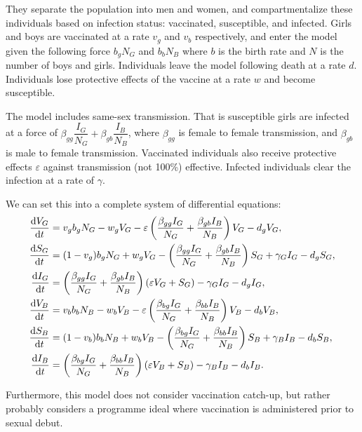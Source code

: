 \documentclass[12pt]{article}
\begin{document}
They separate the population into men and women, and compartmentalize these individuals based on infection status: vaccinated, susceptible, and infected. Girls and boys are vaccinated at a rate $v_g$ and $v_b$ respectively, and enter the model given the following force $b_gN_G$ and $b_bN_B$ where $b$ is the birth rate and $N$ is the number of boys and girls. Individuals leave the model following death at a rate $d$. Individuals lose protective effects of the vaccine at a rate $w$ and become susceptible.  

The model includes same-sex transmission.  That is susceptible girls are infected at a force of $\beta_{gg}\dfrac{I_G}{N_G} + \beta_{gb}\dfrac{I_B}{N_B}$, where $\beta_{gg}$ is female to female transmission, and $\beta_{gb}$ is male to female transmission. Vaccinated individuals also receive protective effects $\varepsilon$ against transmission (not 100\%) effective.  Infected individuals clear the infection at a rate of $\gamma$.  

We can set this into a complete system of differential equations:
\begin{align}
\frac{\mathrm{d}V_G}{\mathrm{d}t}&=v_gb_gN_G - w_gV_G - \varepsilon\left(\frac{\beta_{gg}I_G}{N_G}+\frac{\beta_{gb}I_B}{N_B}\right)V_G - d_gV_G,\\
\frac{\mathrm{d}S_G}{\mathrm{d}t}&=(1-v_g)b_gN_G + w_gV_G - \left(\frac{\beta_{gg}I_G}{N_G}+\frac{\beta_{gb}I_B}{N_B}\right)S_G  + \gamma_G I_G - d_gS_G,\\
\frac{\mathrm{d}I_G}{\mathrm{d}t}&= \left(\frac{\beta_{gg}I_G}{N_G}+\frac{\beta_{gb}I_B}{N_B}\right)(\varepsilon V_G + S_G) - \gamma_G I_G - d_gI_G,\\
\frac{\mathrm{d}V_B}{\mathrm{d}t}&=v_bb_bN_B - w_bV_B - \varepsilon\left(\frac{\beta_{bg}I_G}{N_G}+\frac{\beta_{bb}I_B}{N_B}\right)V_B - d_bV_B,\\
\frac{\mathrm{d}S_B}{\mathrm{d}t}&=(1-v_b)b_bN_B + w_bV_B - \left(\frac{\beta_{bg}I_G}{N_G}+\frac{\beta_{bb}I_B}{N_B}\right)S_B  + \gamma_B I_B - d_bS_B,\\
\frac{\mathrm{d}I_B}{\mathrm{d}t}&= \left(\frac{\beta_{bg}I_G}{N_G}+\frac{\beta_{bb}I_B}{N_B}\right)(\varepsilon V_B + S_B) - \gamma_B I_B - d_bI_B.
\end{align}

Furthermore, this model does not consider vaccination catch-up, but rather probably considers a programme ideal where vaccination is administered prior to sexual debut.  

\end{document}
